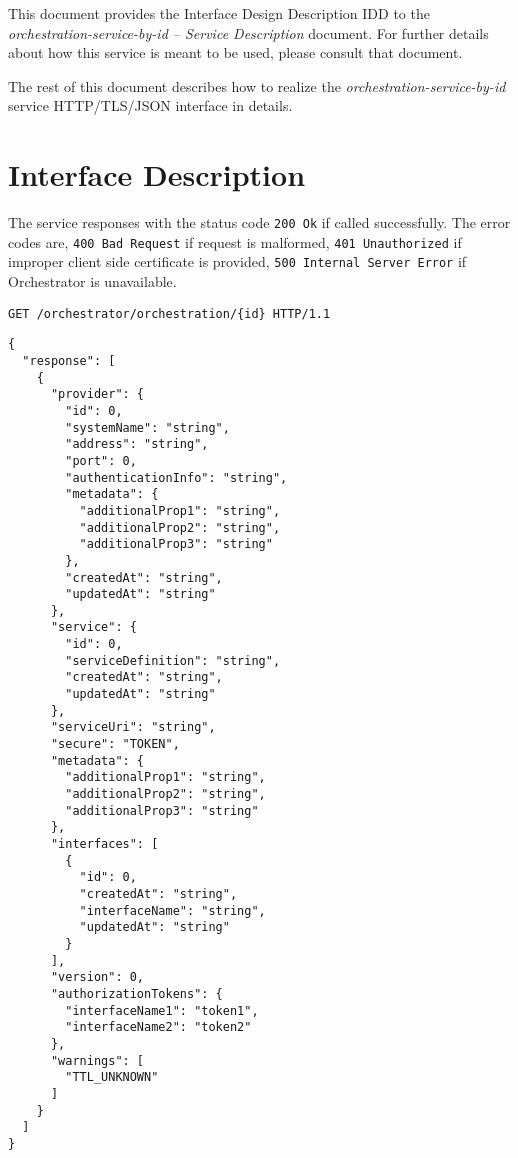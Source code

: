 \documentclass[a4paper]{arrowhead}
\newcommand{\fref}[1]{{\textcolor{ArrowheadBlue}{\hyperref[sec:functions:#1]{#1}}}}
\begin{document}
This document provides the Interface Design Description IDD to the \textit{orchestration-service-by-id -- Service Description} document.
For further details about how this service is meant to be used, please consult that document.

The rest of this document describes how to realize the \textit{orchestration-service-by-id} service HTTP/TLS/JSON interface in details.

\newpage

\section{Interface Description}
\label{sec:functions}

The service responses with the status code \texttt{200 Ok} if called successfully. The error codes are, \texttt{400 Bad Request} if request is malformed, \texttt{401 Unauthorized} if improper client side certificate is provided, \texttt{500 Internal Server Error} if Orchestrator is unavailable.

\begin{lstlisting}[language=http,label={lst:orchestration-by-id},caption={An \fref{orchestration-service-by-id} invocation.}]
GET /orchestrator/orchestration/{id} HTTP/1.1
\end{lstlisting}


\begin{lstlisting}[language=http,label={lst:orchestration-by-id_response},caption={An \fref{orchestration-service-by-id} response.}]
{
  "response": [
    {
      "provider": {
        "id": 0,
        "systemName": "string",
        "address": "string",
        "port": 0,
        "authenticationInfo": "string",
        "metadata": {
          "additionalProp1": "string",
          "additionalProp2": "string",
          "additionalProp3": "string"
        },  
        "createdAt": "string",
        "updatedAt": "string"
      },
      "service": {
        "id": 0,
        "serviceDefinition": "string",
        "createdAt": "string",
        "updatedAt": "string"
      },
      "serviceUri": "string",
      "secure": "TOKEN",
      "metadata": {
        "additionalProp1": "string",
        "additionalProp2": "string",
        "additionalProp3": "string"
      },  
      "interfaces": [
        {
          "id": 0,
          "createdAt": "string",
          "interfaceName": "string",
          "updatedAt": "string"
        }
      ],
      "version": 0,
      "authorizationTokens": {
        "interfaceName1": "token1",
        "interfaceName2": "token2"
      },
      "warnings": [
        "TTL_UNKNOWN"
      ]
    }
  ]
}
\end{lstlisting}
\end{document}
